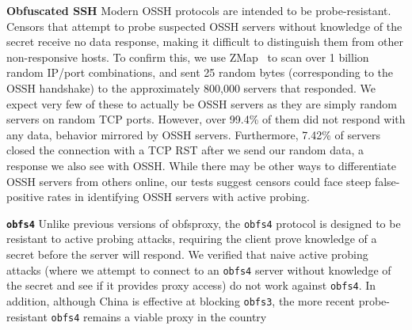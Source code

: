 \documentclass[sigconf,anonymous]{acmart}
\renewcommand{\paragraph}[1]{\smallskip\noindent\textbf{#1\quad}}
\begin{document}
\paragraph{Obfuscated SSH} Modern OSSH protocols are intended to be
probe-resistant. Censors that attempt to probe suspected OSSH servers without
knowledge of the secret receive no data response, making it difficult to
distinguish them from other non-responsive hosts. To confirm this, we use
ZMap~\cite{zmap13} to scan over 1 billion random IP/port combinations, and sent 25
random bytes (corresponding to the OSSH handshake) to the approximately 800,000
servers that responded. We expect very few of these to actually be OSSH
servers as they are simply random servers on random TCP ports.
However, over 99.4\% of them did not respond with any data, behavior mirrored by
OSSH servers.
Furthermore, 7.42\% of servers closed the connection with a TCP RST
after we send our random data, a response we also see with OSSH. While there may
be other ways to differentiate OSSH servers from others online, our tests
suggest censors could face steep false-positive rates in identifying OSSH
servers with active probing.




\paragraph{\texttt{obfs4}}
Unlike previous versions of obfsproxy, the \texttt{obfs4} protocol is designed to
be resistant to active probing
attacks, requiring the client prove knowledge of a secret before the server will
respond. We verified that naive active probing attacks (where we attempt to
connect to an \texttt{obfs4} server without knowledge of the secret and see if
it provides proxy access) do not work
against \texttt{obfs4}. In addition, although China is effective at blocking
\texttt{obfs3}, the more recent probe-resistant \texttt{obfs4} remains a viable
proxy in the country
\end{document}
